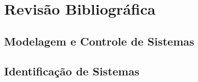 \chapter{Revisão Bibliográfica}

\lipsum[1] %

\section{Modelagem e Controle de Sistemas}


\section{ Identificação de Sistemas}

